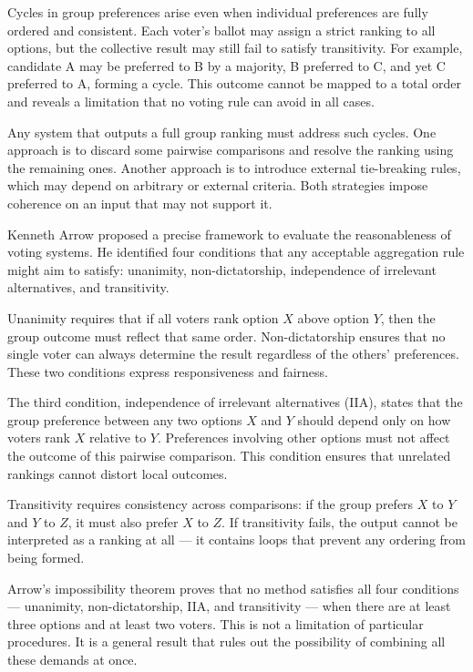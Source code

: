 Cycles in group preferences arise even when individual preferences are fully ordered and consistent. Each voter's ballot may assign a strict ranking to all options, but the collective result may still fail to satisfy transitivity. For example, candidate A may be preferred to B by a majority, B preferred to C, and yet C preferred to A, forming a cycle. This outcome cannot be mapped to a total order and reveals a limitation that no voting rule can avoid in all cases.

Any system that outputs a full group ranking must address such cycles. One approach is to discard some pairwise comparisons and resolve the ranking using the remaining ones. Another approach is to introduce external tie-breaking rules, which may depend on arbitrary or external criteria. Both strategies impose coherence on an input that may not support it.

Kenneth Arrow proposed a precise framework to evaluate the reasonableness of voting systems. He identified four conditions that any acceptable aggregation rule might aim to satisfy: unanimity, non-dictatorship, independence of irrelevant alternatives, and transitivity.

Unanimity requires that if all voters rank option $X$ above option $Y$, then the group outcome must reflect that same order. Non-dictatorship ensures that no single voter can always determine the result regardless of the others' preferences. These two conditions express responsiveness and fairness.

The third condition, independence of irrelevant alternatives (IIA), states that the group preference between any two options $X$ and $Y$ should depend only on how voters rank $X$ relative to $Y$. Preferences involving other options must not affect the outcome of this pairwise comparison. This condition ensures that unrelated rankings cannot distort local outcomes.

Transitivity requires consistency across comparisons: if the group prefers $X$ to $Y$ and $Y$ to $Z$, it must also prefer $X$ to $Z$. If transitivity fails, the output cannot be interpreted as a ranking at all — it contains loops that prevent any ordering from being formed.

Arrow’s impossibility theorem proves that no method satisfies all four conditions — unanimity, non-dictatorship, IIA, and transitivity — when there are at least three options and at least two voters. This is not a limitation of particular procedures. It is a general result that rules out the possibility of combining all these demands at once.

